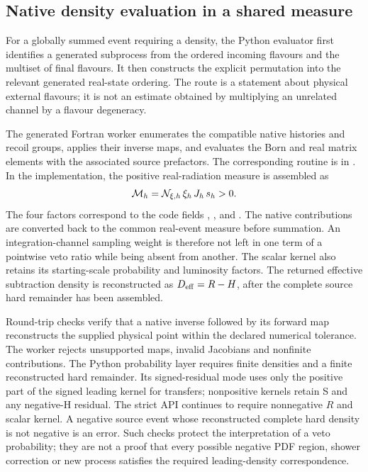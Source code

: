 \subsection{Native density evaluation in a shared measure}
\label{sec:impl-evaluator}

For a globally summed event requiring a density, the Python evaluator first identifies
a generated subprocess from the ordered incoming flavours and the
multiset of final flavours.  It then constructs the explicit
permutation into the relevant generated real-state ordering.
The route is a statement about physical external flavours; it is not
an estimate obtained by multiplying an unrelated channel by a flavour
degeneracy.

The generated Fortran worker enumerates the compatible native
histories and recoil groups, applies their inverse maps, and evaluates
the Born and real matrix elements with the associated source
prefactors.  The corresponding routine is
 in
.  In the implementation, the
positive real-radiation measure is assembled as
\begin{equation}
 {\cal M}_h
 = {\cal N}_{\xi,h}\,\xi_h\,J_h\,s_h >0 .
 \label{eq:impl-native-measure}
\end{equation}
The four factors correspond to the code fields
,
,
 and .
The native contributions are converted back to the common real-event
measure before summation.  An integration-channel sampling weight is
therefore not left in one term of a pointwise veto ratio while being
absent from another.  The scalar kernel also retains its starting-scale
probability and luminosity factors.  The returned effective subtraction
density is reconstructed as \(D_{\rm eff}=R-H\), after the complete
source hard remainder has been assembled.

Round-trip checks verify that a native inverse followed by its forward
map reconstructs the supplied physical point within the declared
numerical tolerance.  The worker rejects unsupported maps, invalid
Jacobians and nonfinite contributions.  The Python probability layer
requires finite densities and a finite reconstructed hard remainder.
Its signed-residual mode uses only the positive part of the signed
leading kernel for transfers; nonpositive kernels retain S and any
negative-H residual. The strict API continues to require nonnegative
\(R\) and scalar kernel.
A negative source event whose reconstructed complete hard density is
not negative is an error.  Such checks protect the interpretation of a
veto probability; they are not a proof that every possible negative
PDF region, shower correction or new process satisfies the required
leading-density correspondence.

